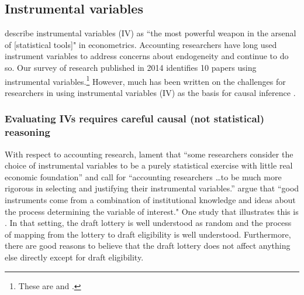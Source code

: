 \documentclass[11pt,reqno,titlepage]{amsart}
\begin{document}
\begin{doublespace}
\subsection{Instrumental variables}
\citet[p.114]{Angrist:2008vk} describe instrumental variables (IV) as ``the most powerful weapon in the arsenal of [statistical tools]" in econometrics. 
Accounting researchers have long used instrument variables to address concerns about endogeneity \citep{Larcker:2010fq} and continue to do so.
Our survey of research published in 2014 identifies 10 papers using instrumental variables.\footnote{
These are \citet{Cannon:2014im,Cohen:2014jl,Kim:2014fm,Vermeer:2014bs,Fox:2014io,Guedhami:2013cj,Houston:2014hv,deFranco:2014ct,Erkens:2014hj} and \citet{Correia:2014fp}.}
However, much has been written on the challenges for researchers in using instrumental variables (IV) as the basis for causal inference \citep[e.g.,][]{Roberts:2013cz}. 

\subsubsection{Evaluating IVs requires careful causal (not statistical) reasoning}

With respect to accounting research, \citet{Larcker:2010fq} lament that ``some researchers consider the choice of instrumental variables to be a purely statistical exercise with little real economic foundation'' and call for 
``accounting researchers \dots to be much more rigorous in selecting and justifying their instrumental variables.'' 
\citet[p.117]{Angrist:2008vk} argue that ``good instruments come from a combination of institutional knowledge and ideas about the process determining the variable of interest."
One study that illustrates this is \citet{Angrist:1990dk}.
In that setting, the draft lottery is well understood as random and the process of mapping from the lottery to draft eligibility is well understood.
Furthermore, there are good reasons to believe that the draft lottery does not affect anything else directly except for draft eligibility.



\end{doublespace}
\end{document}
